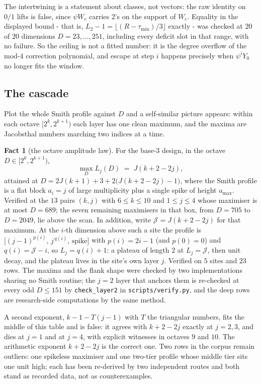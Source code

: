 \documentclass[11pt]{amsart}
\theoremstyle{definition}
\newtheorem{fact}[theorem]{Fact}
\theoremstyle{remark}
\begin{document}
The intertwining is a statement about classes, not vectors: the raw identity on $0/1$ lifts is false, since $\psi W_c$ carries $2$'s on the support of $W_c$. Equality in the displayed bound - that is, $L_2 - 1 = \lfloor (R - \tau_{\min})/3 \rfloor$ exactly - was checked at $20$ of $20$ dimensions $D = 23,\dots,251$, including every deficit slot in that range, with no failure. So the ceiling is not a fitted number: it is the degree overflow of the mod-$4$ correction polynomial, and escape at step $i$ happens precisely when $\psi^i Y_0$ no longer fits the window.

\subsection*{The cascade}

Plot the whole Smith profile against $D$ and a self-similar picture appears: within each octave $[2^k, 2^{k+1})$ each layer has one clean maximum, and the maxima are Jacobsthal numbers marching two indices at a time.

\begin{fact}[the octave amplitude law]
\label{b:fact:octave}
For the base-$3$ design, in the octave $D \in [2^k, 2^{k+1})$,
\[
  \max_D L_j(D) \;=\; J(k + 2 - 2j),
\]
attained at $D = 2J(k+1) + 3 + 2\bigl(J(k+2-2j) - 1\bigr)$, where the Smith profile is a flat block $a_i = j$ of large multiplicity plus a single spike of height $a_{\max}$. Verified at the $13$ pairs $(k,j)$ with $6 \le k \le 10$ and $1 \le j \le 4$ whose maximiser is at most $D = 689$; the seven remaining maximisers in that box, from $D = 705$ to $D = 2049$, lie above the scan. In addition, write $\mathcal{J} = J(k+2-2j)$ for that maximum. At the $i$-th dimension above such a site the profile is $\bigl[(j-1)^{p(i)},\, j^{\,q(i)},\, \text{spike}\bigr]$ with $p(i) = 2i-1$ (and $p(0) = 0$) and $q(i) = \mathcal{J} - i$, so $L_j = q(i)+1$: a plateau of length $2$ at $L_j = \mathcal{J}$, then unit decay, and the plateau lives in the site's own layer $j$. Verified on $5$ sites and $23$ rows. The maxima and the flank shape were checked by two implementations sharing no Smith routine; the $j = 2$ layer that anchors them is re-checked at every odd $D \le 151$ by \texttt{check\_layer2} in \texttt{scripts/verify.py}, and the deep rows are research-side computations by the same method.
\end{fact}

A second exponent, $k - 1 - T(j-1)$ with $T$ the triangular numbers, fits the middle of this table and is false: it agrees with $k+2-2j$ exactly at $j = 2, 3$, and dies at $j = 1$ and at $j = 4$, with explicit witnesses in octaves $9$ and $10$. The arithmetic exponent $k+2-2j$ is the correct one. Two rows in the corpus remain outliers: one spikeless maximiser and one two-tier profile whose middle tier sits one unit high; each has been re-derived by two independent routes and both stand as recorded data, not as counterexamples.
\end{document}
